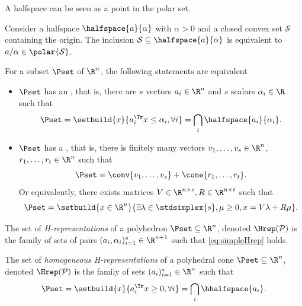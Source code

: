 \documentclass[11pt,twoside,a4paper,openright]{uclouvain-thesis}
\newcommand{\ineqnum}{s}
\begin{document}
A halfspace can be seen as a point in the polar set.
\begin{myprop}
  \label{prop:vhpolar}
  Consider a halfspace $\halfspace{a}{\alpha}$ with $\alpha > 0$
  and a closed convex set $\mathcal{S}$ containing the origin.
  The inclusion $\mathcal{S} \subseteq \halfspace{a}{\alpha}$
  is equivalent to $a/\alpha \in \polar{\mathcal{S}}$.
\end{myprop}

\begin{mytheo}
  \label{theo:weylminkowskicont}
  For a subset $\Pset$ of $\R^n$, the following statements are equivalent
  \begin{itemize}
    \item $\Pset$ has an \emph{\hrep}, that is, there are $\ineqnum$ vectors $a_i \in \R^n$ and $\ineqnum$ scalars $\alpha_i \in \R$ such that
      \begin{equation}
        \label{eq:simpleHrep}
        \Pset = \setbuild{x}{a_i^\Tr x \le \alpha_i, \forall i} = \bigcap_i \halfspace{a_i}{\alpha_i}.
      \end{equation}
    \item $\Pset$ has a \emph{\vrep}, that is, there is finitely many vectors $v_1, \ldots, v_s \in \R^n$, $r_1, \ldots, r_t \in \R^n$ such that
      \begin{equation}
        \label{eq:Vrep}
        \Pset = \conv\{v_1, \ldots, v_s\} + \cone\{r_1, \ldots, r_t\}. %
      \end{equation}
      Or equivalently, there exists matrices $V \in \R^{n \times s}, R \in \R^{n \times t}$ such that
      \begin{equation}
      \label{eq:simpleVrep}
        \Pset = \setbuild{x \in \R^n}{\exists \lambda \in \stdsimplex{s}, \mu \geq 0, x = V\lambda + R\mu}.
      \end{equation}
  \end{itemize}
\end{mytheo}

\begin{mydef}
  The set of \emph{H-representations} of a polyhedron $\Pset \subseteq \R^n$, denoted $\Hrep(\mathcal{P})$ is the family of sets of pairs $(a_i, \alpha_i)_{i=1}^{\ineqnum} \in \R^{n+1}$ such that \eqref{eq:simpleHrep} holds.
\end{mydef}

\begin{mydef}
  The set of \emph{homogeneous H-representations} of a polyhedral cone $\Pset \subseteq \R^n$, denoted $\Hrep(\mathcal{P})$ is the family of sets $(a_i)_{i=1}^{\ineqnum} \in \R^{n}$ such that
  \[ \Pset = \setbuild{x}{a_i^\Tr x \ge 0, \forall i} = \bigcap_i \hhalfspace{a_i}. \]
\end{mydef}
\end{document}
